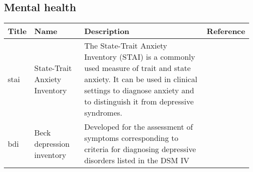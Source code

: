 \documentclass[]{book}
\begin{document}
\hypertarget{mental-health}{%
\subsection{Mental health}\label{mental-health}}

\begin{longtable}[]{@{}llll@{}}
\toprule
\begin{minipage}[b]{0.22\columnwidth}\raggedright
Title\strut
\end{minipage} & \begin{minipage}[b]{0.27\columnwidth}\raggedright
Name\strut
\end{minipage} & \begin{minipage}[b]{0.22\columnwidth}\raggedright
Description\strut
\end{minipage} & \begin{minipage}[b]{0.18\columnwidth}\raggedright
Reference\strut
\end{minipage}\tabularnewline
\midrule
\endhead
\begin{minipage}[t]{0.22\columnwidth}\raggedright
stai\strut
\end{minipage} & \begin{minipage}[t]{0.27\columnwidth}\raggedright
State-Trait Anxiety Inventory\strut
\end{minipage} & \begin{minipage}[t]{0.22\columnwidth}\raggedright
The State-Trait Anxiety Inventory (STAI) is a commonly used measure of trait and state anxiety. It can be used in clinical settings to diagnose anxiety and to distinguish it from depressive syndromes.\strut
\end{minipage} & \begin{minipage}[t]{0.18\columnwidth}\raggedright
\strut
\end{minipage}\tabularnewline
\begin{minipage}[t]{0.22\columnwidth}\raggedright
bdi\strut
\end{minipage} & \begin{minipage}[t]{0.27\columnwidth}\raggedright
Beck depression inventory\strut
\end{minipage} & \begin{minipage}[t]{0.22\columnwidth}\raggedright
Developed for the assessment of symptoms corresponding to criteria for diagnosing depressive disorders listed in the DSM IV\strut
\end{minipage} & \begin{minipage}[t]{0.18\columnwidth}\raggedright

\end{minipage}
\end{longtable}
\end{document}
